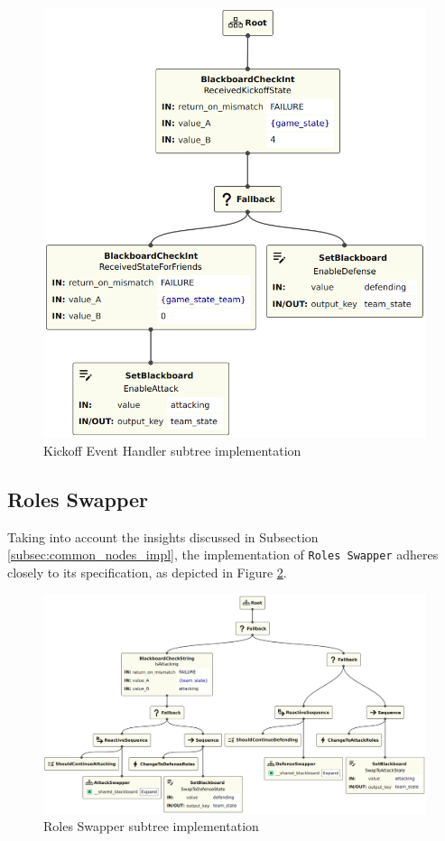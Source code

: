 \begin{figure}[!h]
    \centering
    \includegraphics[width=0.65\linewidth]{images/implementation/KickoffEventHandler.png}
    \caption{Kickoff Event Handler subtree implementation}
    \label{fig:kickoff_event_handler_impl}
\end{figure}

\subsection{Roles Swapper}

Taking into account the insights discussed in Subsection \ref{subsec:common_nodes_impl}, the implementation of \texttt{Roles Swapper} adheres closely to its specification, as depicted in Figure \ref{fig:roles_swapper_impl}.

\begin{figure}[!h]
    \centering
    \includegraphics[width=1.0\linewidth]{images/implementation/RolesSwapper.png}
    \caption{Roles Swapper subtree implementation}
    \label{fig:roles_swapper_impl}
\end{figure}


